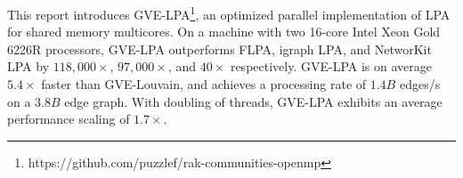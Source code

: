 This report introduces GVE-LPA\footnote{https://github.com/puzzlef/rak-communities-openmp}, an optimized parallel implementation of LPA for shared memory multicores. On a machine with two 16-core Intel Xeon Gold 6226R processors, GVE-LPA outperforms FLPA, igraph LPA, and NetworKit LPA by $118,000\times$, $97,000\times$, and $40\times$ respectively. GVE-LPA is on average $5.4\times$ faster than GVE-Louvain, and achieves a processing rate of $1.4 B$ edges/s on a $3.8 B$ edge graph. With doubling of threads, GVE-LPA exhibits an average performance scaling of $1.7\times$.








